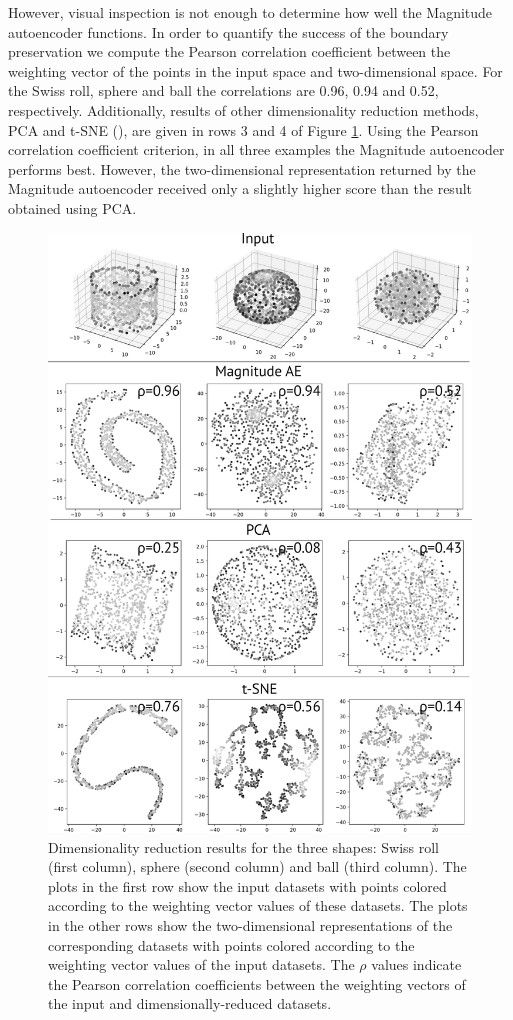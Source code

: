 \documentclass{article}
\begin{document}
However, visual inspection is not enough to determine how well the Magnitude autoencoder functions. In order to quantify the success of the boundary preservation we compute the Pearson correlation coefficient between the weighting vector of the points in the input space and two-dimensional space. For the Swiss roll, sphere and ball the correlations are 0.96, 0.94 and 0.52, respectively. Additionally, results of other dimensionality reduction methods, PCA and t-SNE (\cite{t-SNE}), are given in rows 3 and 4 of Figure \ref{fig:basic_shapes}. Using the Pearson correlation coefficient criterion, in all three examples the Magnitude autoencoder performs best. However, the two-dimensional representation returned by the Magnitude autoencoder received only a slightly higher score than the result obtained using PCA.

\begin{figure}
  \includegraphics[width=\linewidth]{../figures/2_basic_shapes/plot_wlabels.png}
  \caption{Dimensionality reduction results for the three shapes: Swiss roll (first column), sphere (second column) and ball (third column). The plots in the first row show the input datasets with points colored according to the weighting vector values of these datasets. The plots in the other rows show the two-dimensional representations of the corresponding datasets with points colored according to the weighting vector values of the input datasets. The $\rho$ values indicate the Pearson correlation coefficients between the weighting vectors of the input and dimensionally-reduced datasets.}
  \label{fig:basic_shapes}
\end{figure}
\end{document}
